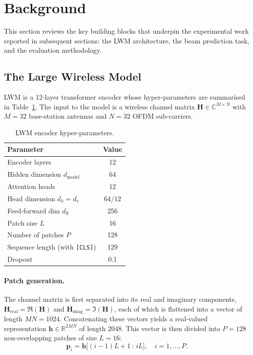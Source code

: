 \documentclass[12pt,a4paper]{article}
\begin{document}
\newpage
\section{Background}\label{sec:background}

This section reviews the key building blocks that underpin the experimental work reported in subsequent sections: the LWM architecture, the beam prediction task, and the evaluation methodology.

\subsection{The Large Wireless Model}\label{subsec:lwm}

LWM is a 12-layer transformer encoder whose hyper-parameters are summarised in Table~\ref{tab:lwm_config}.  The input to the model is a wireless channel matrix $\mathbf{H}\in\mathbb{C}^{M\times N}$ with $M=32$ base-station antennas and $N=32$ OFDM sub-carriers.

\begin{table}[h]
\centering
\caption{LWM encoder hyper-parameters.}
\label{tab:lwm_config}
\begin{tabular}{@{}lc@{}}
\toprule
\textbf{Parameter} & \textbf{Value} \\
\midrule
Encoder layers       & 12 \\
Hidden dimension $d_{\text{model}}$   & 64 \\
Attention heads      & 12 \\
Head dimension $d_k = d_v$ & $64/12$ \\
Feed-forward dim $d_{\text{ff}}$ & 256 \\
Patch size $L$       & 16 \\
Number of patches $P$& 128 \\
Sequence length (with \texttt{[CLS]}) & 129 \\
Dropout              & 0.1 \\
\bottomrule
\end{tabular}
\end{table}

\paragraph{Patch generation.}
The channel matrix is first separated into its real and imaginary components, $\mathbf{H}_{\text{real}}=\Re(\mathbf{H})$ and $\mathbf{H}_{\text{imag}}=\Im(\mathbf{H})$, each of which is flattened into a vector of length $MN=1024$.  Concatenating these vectors yields a real-valued representation $\mathbf{h}\in\mathbb{R}^{2MN}$ of length 2048.  This vector is then divided into $P=128$ non-overlapping patches of size $L=16$:
\begin{equation}
  \mathbf{p}_i = \mathbf{h}\bigl[(i-1)L+1 \,:\, iL\bigr], \quad i=1,\dots,P.
  \label{eq:patches}
\end{equation}
\end{document}
